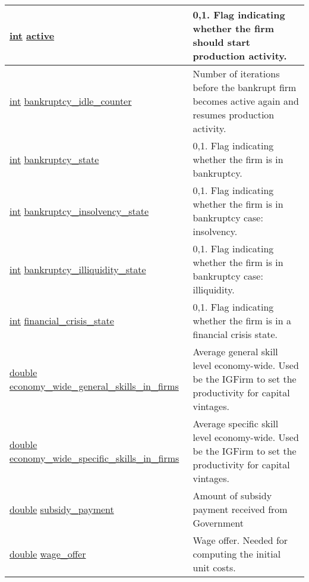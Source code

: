 \documentclass[a4paper,11pt]{article}
\begin{document}
\begin{longtable}[H!]{ll}
\midrule
\parbox{5cm}{\url{int} \url{active}}  & \parbox{10cm}{0,1. Flag indicating whether the firm should start production activity.} \\
\midrule
\parbox{5cm}{\url{int} \url{bankruptcy_idle_counter}}  & \parbox{10cm}{Number of iterations before the bankrupt firm becomes active again and resumes production activity.} \\
\midrule
\parbox{5cm}{\url{int} \url{bankruptcy_state}}  & \parbox{10cm}{0,1. Flag indicating whether the firm is in bankruptcy.} \\
\midrule
\parbox{5cm}{\url{int} \url{bankruptcy_insolvency_state}}  & \parbox{10cm}{0,1. Flag indicating whether the firm is in bankruptcy case: insolvency.} \\
\midrule
\parbox{5cm}{\url{int} \url{bankruptcy_illiquidity_state}}  & \parbox{10cm}{0,1. Flag indicating whether the firm is in bankruptcy case: illiquidity.} \\
\midrule
\parbox{5cm}{\url{int} \url{financial_crisis_state}}  & \parbox{10cm}{0,1. Flag indicating whether the firm is in a financial crisis state.} \\
\midrule
\parbox{5cm}{\url{double} \url{economy_wide_general_skills_in_firms}}  & \parbox{10cm}{Average general skill level economy-wide. Used be the IGFirm to set the productivity for capital vintages.} \\
\midrule
\parbox{5cm}{\url{double} \url{economy_wide_specific_skills_in_firms}}  & \parbox{10cm}{Average specific skill level economy-wide. Used be the IGFirm to set the productivity for capital vintages.} \\
\midrule
\parbox{5cm}{\url{double} \url{subsidy_payment}}  & \parbox{10cm}{Amount of subsidy payment received from Government} \\
\midrule
\parbox{5cm}{\url{double} \url{wage_offer}}  & \parbox{10cm}{Wage offer. Needed for computing the initial unit costs.} \\
\end{longtable}
\end{document}
